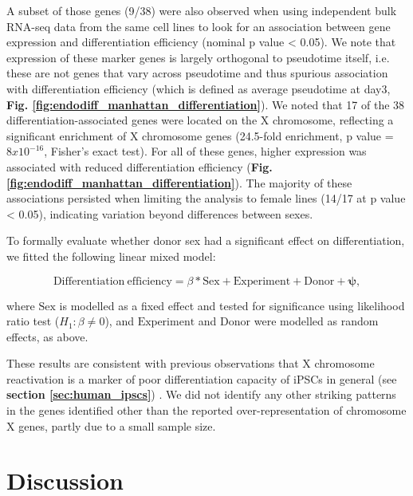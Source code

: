 A subset of those genes (9/38) were also observed when using independent bulk RNA-seq data from the same cell lines to look for an association between gene expression and differentiation efficiency (nominal p value < 0.05). 
We note that expression of these marker genes is largely orthogonal to pseudotime itself, i.e. these are not genes that vary across pseudotime and thus spurious association with differentiation efficiency (which is defined as average pseudotime at day3, \textbf{Fig. \ref{fig:endodiff_manhattan_differentiation}}). 
We noted that 17 of the 38 differentiation-associated genes were located on the X chromosome, reflecting a significant enrichment of X chromosome genes (24.5-fold enrichment, p value = $8x10^{-16}$, Fisher’s exact test). 
For all of these genes, higher expression was associated with reduced differentiation efficiency (\textbf{Fig. \ref{fig:endodiff_manhattan_differentiation}}). 
The majority of these associations persisted when limiting the analysis to female lines (14/17 at p value < 0.05), indicating variation beyond differences between sexes. 

\newpage

To formally evaluate whether donor sex had a significant effect on differentiation, we fitted the following linear mixed model:

\begin{equation}
    \mathrm{Differentiation} \ \mathrm{efficiency} = \beta*\mathrm{Sex} + \mathrm{Experiment} + \mathrm{Donor} + \boldsymbol{\psi},
\end{equation}

where $\mathrm{Sex}$ is modelled as a fixed effect and tested for significance using likelihood ratio test ($H_1: \beta \neq 0$), and $\mathrm{Experiment}$ and $\mathrm{Donor}$ were modelled as random effects, as above.

These results are consistent with previous observations that X chromosome reactivation is a marker of poor differentiation capacity of iPSCs in general (see \textbf{section \ref{sec:human_ipscs}}) \cite{anguera2012molecular, patel2017human}. 
We did not identify any other striking patterns in the genes identified other than the reported over-representation of chromosome X genes, partly due to a small sample size.



\section{Discussion}

